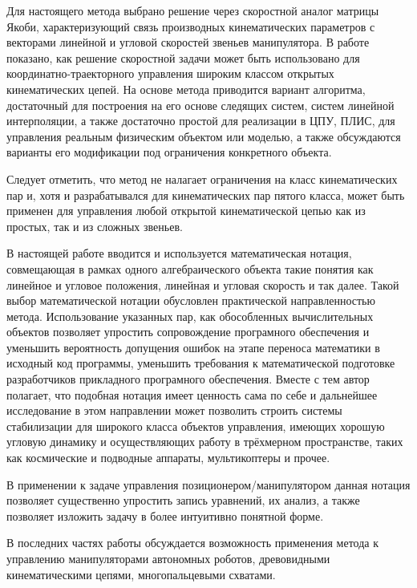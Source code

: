 Для настоящего метода выбрано решение через скоростной аналог матрицы Якоби, характеризующий связь производных кинематических параметров с векторами линейной и угловой скоростей звеньев манипулятора. В работе показано, как решение скоростной задачи может быть использовано для координатно-траекторного управления широким классом открытых кинематических цепей. На основе метода приводится вариант алгоритма, достаточный для построения на его основе следящих систем, систем линейной интерполяции, а также достаточно простой для реализации в ЦПУ, ПЛИС, для управления реальным физическим объектом или моделью, а также обсуждаются варианты его модификации под ограничения конкретного объекта.

Следует отметить, что метод не налагает ограничения на класс кинематических пар и, хотя и разрабатывался для кинематических пар пятого класса, может быть применен для управления любой открытой кинематической цепью как из простых, так и из сложных звеньев.

В настоящей работе вводится и используется математическая нотация, совмещающая в рамках одного алгебраического объекта такие понятия как линейное и угловое положения, линейная и угловая скорость и так далее. Такой выбор математической нотации обусловлен практической направленностью метода. Использование указанных пар, как обособленных вычислительных объектов позволяет упростить сопровождение програмного обеспечения и уменьшить вероятность допущения ошибок на этапе переноса математики в исходный код программы, уменьшить требования к математической подготовке разработчиков прикладного програмного обеспечения. Вместе с тем автор полагает, что подобная нотация имеет ценность сама по себе и дальнейшее исследование в этом направлении может позволить строить системы стабилизации для широкого класса объектов управления, имеющих хорошую угловую динамику и осуществляющих работу в трёхмерном пространстве, таких как космические и подводные аппараты, мультикоптеры и прочее.

В применении к задаче управления позиционером/манипулятором данная нотация позволяет существенно упростить запись уравнений, их анализ, а также позволяет изложить задачу в более интуитивно понятной форме.

В последних частях работы обсуждается возможность применения метода к управлению манипуляторами автономных роботов, древовидными кинематическими цепями, многопальцевыми схватами. 